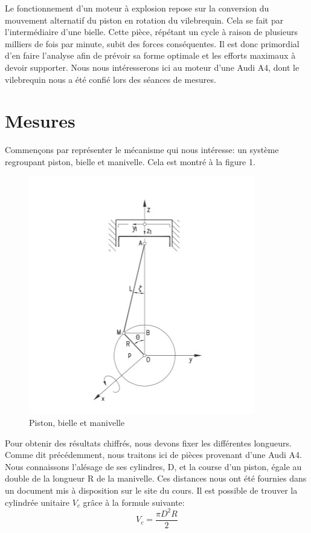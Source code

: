 \documentclass[a4paper,oneside,12pt]{report}
\begin{document}
Le fonctionnement d'un moteur à explosion repose sur la conversion du mouvement alternatif du piston en rotation du vilebrequin. Cela se fait par l'intermédiaire d'une bielle. Cette pièce, répétant un cycle à raison de plusieurs milliers de fois par minute, subit des forces conséquentes. Il est donc primordial d'en faire l'analyse afin de prévoir sa forme optimale et les efforts maximaux à devoir supporter. Nous nous intéresserons ici au moteur d'une Audi A4, dont le vilebrequin nous a été confié lors des séances de mesures.

\section{Mesures}

Commençons par représenter le mécanisme qui nous intéresse: un système regroupant piston, bielle et manivelle. Cela est montré à la figure 1. \\

\begin{figure}	
	\center
	\includegraphics[scale=0.8]{Dessin.jpg}
	\caption{Piston, bielle et manivelle}
\end{figure}

Pour obtenir des résultats chiffrés, nous devons fixer les différentes longueurs. Comme dit précédemment, nous traitons ici de pièces provenant d'une Audi A4. Nous connaissons l'alésage de ses cylindres, D, et la course d'un piston, égale au double de la longueur R de la manivelle. Ces distances nous ont été fournies dans un document mis à disposition sur le site du cours. Il est possible de trouver la cylindrée unitaire $V_c$ grâce à la formule suivante: 
$$V_c =\frac{\pi D^2 R}{2}$$
\end{document}
